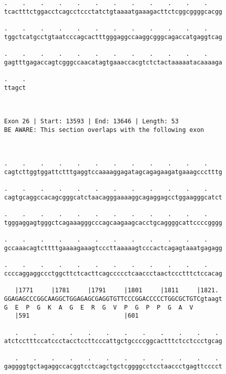 \documentclass{article}
\begin{document}
\begin{Verbatim}
.    .    .    .    .    .    .    .    .    .    .    .    
tcactttctggacctcagcctccctatctgtaaaatgaaagacttctcggcggggcacgg
                                                            
.    .    .    .    .    .    .    .    .    .    .    .    
tggctcatgcctgtaatcccagcactttgggaggccaaggcgggcagaccatgaggtcag
                                                            
.    .    .    .    .    .    .    .    .    .    .    .    
gagtttgagaccagtcgggccaacatagtgaaaccacgtctctactaaaaatacaaaaga
                                                            
.    .
ttagct
      
      
 
Exon 26 | Start: 13593 | End: 13646 | Length: 53
BE AWARE: This section overlaps with the following exon



.    .    .    .    .    .    .    .    .    .    .    .    
cagtcttggtggattctttgaggtccaaaaggagatagcagagaagatgaaagccctttg
                                                            
.    .    .    .    .    .    .    .    .    .    .    .    
cagtgcaggccacagcgggcatctaacagggaaaaggcagaggagcctggaagggcatct
                                                            
.    .    .    .    .    .    .    .    .    .    .    .    
tgggaggagtgggctcagaaagggcccagcaagaagcacctgcaggggcattccccgggg
                                                            
.    .    .    .    .    .    .    .    .    .    .    .    
gccaaacagtcttttgaaaagaaagtcccttaaaaagtcccactcagagtaaatgagagg
                                                            
.    .    .    .    .    .    .    .    .    .    .    .    
ccccaggaggccctggcttctcacttcagccccctcaaccctaactccctttctccacag
                                                            
   |1771     |1781     |1791     |1801     |1811     |1821. 
GGAGAGCCCGGCAAGGCTGGAGAGCGAGGTGTTCCCGGACCCCCTGGCGCTGTCgtaagt
G  E  P  G  K  A  G  E  R  G  V  P  G  P  P  G  A  V        
   |591                          |601                       
  
   .    .    .    .    .    .    .    .    .    .    .    . 
atctcctttccatccctacctccttcccattgctgccccggcactttctcctccctgcag
                                                            
   .    .    .    .    .    .    .    .    .    .    .    . 
gaggggtgctagaggccacggtcctcagctgctcggggcctcctaaccctgagttcccct
                                                            

\end{Verbatim}
\end{document}
